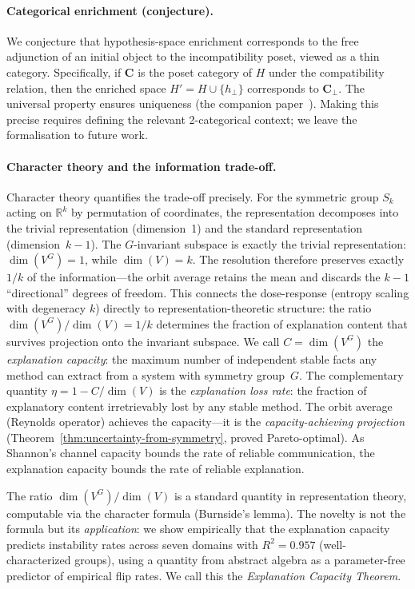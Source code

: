 \documentclass[11pt,a4paper]{article}
\newcommand{\R}{\mathbb{R}}
\begin{document}
\paragraph{Categorical enrichment (conjecture).}
We conjecture that hypothesis-space enrichment corresponds to the free adjunction of an initial object to the incompatibility poset, viewed as a thin category. Specifically, if $\mathbf{C}$ is the poset category of $H$ under the compatibility relation, then the enriched space $H' = H \cup \{h_\bot\}$ corresponds to $\mathbf{C}_\bot$. The universal property ensures uniqueness (the companion paper~\citep{caraker2026ostrowski}). Making this precise requires defining the relevant 2-categorical context; we leave the formalisation to future work.

\paragraph{Character theory and the information trade-off.}
Character theory quantifies the trade-off precisely.  For the symmetric
group $S_k$ acting on $\R^k$ by permutation of coordinates, the
representation decomposes into the trivial representation (dimension~1)
and the standard representation (dimension~$k - 1$).  The $G$-invariant
subspace is exactly the trivial representation: $\dim(V^G) = 1$, while
$\dim(V) = k$.  The resolution therefore preserves exactly $1/k$ of the
information---the orbit average retains the mean and discards the
$k - 1$ ``directional'' degrees of freedom.  This connects the
dose-response (entropy scaling with degeneracy $k$) directly to
representation-theoretic structure: the ratio
$\dim(V^G) / \dim(V) = 1/k$ determines the fraction of explanation
content that survives projection onto the invariant subspace.
We call $C = \dim(V^G)$ the \emph{explanation capacity}: the maximum
number of independent stable facts any method can extract from a system
with symmetry group~$G$.  The complementary quantity $\eta = 1 - C/\dim(V)$
is the \emph{explanation loss rate}: the fraction of explanatory content
irretrievably lost by any stable method.  The orbit average (Reynolds
operator) achieves the capacity---it is the \emph{capacity-achieving
projection} (Theorem~\ref{thm:uncertainty-from-symmetry}, proved
Pareto-optimal).  As Shannon's channel capacity bounds the rate of
reliable communication, the explanation capacity bounds the rate of
reliable explanation.

The ratio $\dim(V^G)/\dim(V)$ is a standard quantity in representation theory, computable via the character formula (Burnside's lemma).  The novelty is not the formula but its \emph{application}: we show empirically that the explanation capacity predicts instability rates across seven domains with $R^2 = 0.957$ (well-characterized groups), using a quantity from abstract algebra as a parameter-free predictor of empirical flip rates.  We call this the \emph{Explanation Capacity Theorem}.
\end{document}
